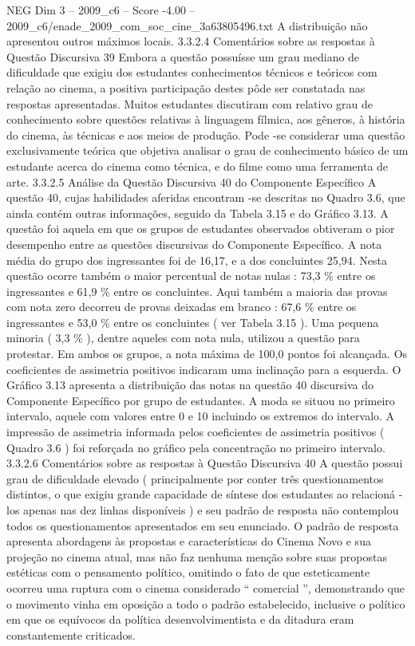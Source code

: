 \begin{textsample}{NEG Dim 3 – 2009\_c6 – Score -4.00 – 2009\_c6/enade\_2009\_com\_soc\_cine\_3a63805496.txt}
A distribuição não apresentou outros máximos locais. 3.3.2.4 Comentários sobre as respostas à Questão Discursiva 39 Embora a questão possuísse um grau mediano de dificuldade que exigiu dos estudantes conhecimentos técnicos e teóricos com relação ao cinema, a positiva participação destes pôde ser constatada nas respostas apresentadas.
Muitos estudantes discutiram com relativo grau de conhecimento sobre questões relativas à linguagem fílmica, aos gêneros, à história do cinema, às técnicas e aos meios de produção.
Pode -se considerar uma questão exclusivamente teórica que objetiva analisar o grau de conhecimento básico de um estudante acerca do cinema como técnica, e do filme como uma ferramenta de arte. 3.3.2.5 Análise da Questão Discursiva 40 do Componente Específico A questão 40, cujas habilidades aferidas encontram -se descritas no Quadro 3.6, que ainda contém outras informações, seguido da Tabela 3.15 e do Gráfico 3.13.
A questão foi aquela em que os grupos de estudantes observados obtiveram o pior desempenho entre as questões discursivas do Componente Específico.
A nota média do grupo dos ingressantes foi de 16,17, e a dos concluintes 25,94.
Nesta questão ocorre também o maior percentual de notas nulas : 73,3 \% entre os ingressantes e 61,9 \% entre os concluintes.
Aqui também a maioria das provas com nota zero decorreu de provas deixadas em branco : 67,6 \% entre os ingressantes e 53,0 \% entre os concluintes ( ver Tabela 3.15 ).
Uma pequena minoria ( 3,3 \% ), dentre aqueles com nota nula, utilizou a questão para protestar.
Em ambos os grupos, a nota máxima de 100,0 pontos foi alcançada.
Os coeficientes de assimetria positivos indicaram uma inclinação para a esquerda.
O Gráfico 3.13 apresenta a distribuição das notas na questão 40 discursiva do Componente Específico por grupo de estudantes.
A moda se situou no primeiro intervalo, aquele com valores entre 0 e 10 incluindo os extremos do intervalo.
A impressão de assimetria informada pelos coeficientes de assimetria positivos ( Quadro 3.6 ) foi reforçada no gráfico pela concentração no primeiro intervalo. 3.3.2.6 Comentários sobre as respostas à Questão Discursiva 40 A questão possui grau de dificuldade elevado ( principalmente por conter três questionamentos distintos, o que exigiu grande capacidade de síntese dos estudantes ao relacioná -los apenas nas dez linhas disponíveis ) e seu padrão de resposta não contemplou todos os questionamentos apresentados em seu enunciado.
O padrão de resposta apresenta abordagens às propostas e características do Cinema Novo e sua projeção no cinema atual, mas não faz nenhuma menção sobre suas propostas estéticas com o pensamento político, omitindo o fato de que esteticamente ocorreu uma ruptura com o cinema considerado “ comercial ”, demonstrando que o movimento vinha em oposição a todo o padrão estabelecido, inclusive o político em que os equívocos da política desenvolvimentista e da ditadura eram constantemente criticados.

\end{textsample}
